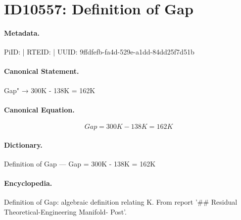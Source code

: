 \section*{ID10557: Definition of Gap}
\paragraph{Metadata.}
PiID:  | RTEID:  | UUID: 9ffdfefb-fa4d-529e-a1dd-84dd25f7d51b

\paragraph{Canonical Statement.}
Gap" → 300K - 138K = 162K

\paragraph{Canonical Equation.}
\[
Gap = 300K - 138K = 162K
\]

\paragraph{Dictionary.}
Definition of Gap — Gap = 300K - 138K = 162K

\paragraph{Encyclopedia.}
Definition of Gap: algebraic definition relating K. From report '\#\# Residual Theoretical-Engineering Manifold- Post'.
